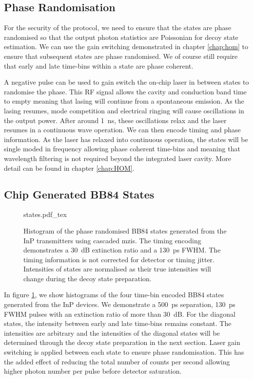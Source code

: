 \subsection{Phase Randomisation}

For the security of the protocol, we need to ensure that the states are phase randomised so that the output photon statistics are Poissonian for decoy state estimation. We can use the gain switching demonstrated in chapter \ref{chap:hom} to ensure that subsequent states are phase randomised. We of course still require that early and late time-bins within a state are phase coherent. 

A negative pulse can be used to gain switch the on-chip laser in between states to randomise the phase. This RF signal allows the cavity and conduction band time to empty meaning that lasing will continue from a spontaneous emission. As the lasing resumes, mode competition and electrical ringing will cause oscillations in the output power. After around \SI{1}{ns}, these oscillations relax and the laser resumes in a continuous wave operation. We can then encode timing and phase information. As the laser has relaxed into continuous operation, the states will be single moded in frequency allowing phase coherent time-bins and meaning that wavelength filtering is not required beyond the integrated laser cavity. More detail can be found in chapter \ref{chap:HOM}.

\subsection{Chip Generated BB84 States}

\begin{figure}[tbp]
	\centering
	\small
	\def\svgwidth{\textwidth} 
	{states.pdf_tex}
	\caption[Phase randomised BB84 states generated from the InP transmitters]{Histogram of the phase randomised BB84 states generated from the \ac{InP} transmitters using cascaded \acp{mzi}. The timing encoding demonstrates a \SI{30}{dB} extinction ratio and a \SI{130}{\ps} \ac{FWHM}. The timing information is not corrected for detector or timing jitter. Intensities of states are normalised as their true intensities will change during the decoy state preparation.}
	\label{fig:states}
\end{figure}

In figure \ref{fig:states}, we show histograms of the four time-bin encoded BB84 states generated from the \ac{InP} devices. We demonstrate a \SI{500}{ps} separation, \SI{130}{ps} \ac{FWHM} pulses with an extinction ratio of more than \SI{30}{dB}. For the diagonal states, the intensity between early and late time-bins remains constant. The intensities are arbitrary and the intensities of the diagonal states will be determined through the decoy state preparation in the next section. Laser gain switching is applied between each state to ensure phase randomisation. This has the added effect of reducing the total number of counts per second allowing higher photon number per pulse before detector saturation.

